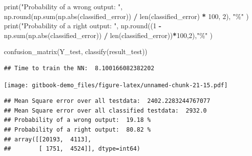 \documentclass[
]{book}
\newenvironment{Shaded}{\begin{snugshade}}{\end{snugshade}}
\newcommand{\BuiltInTok}[1]{#1}
\newcommand{\DecValTok}[1]{\textcolor[rgb]{0.00,0.00,0.81}{#1}}
\newcommand{\NormalTok}[1]{#1}
\newcommand{\OperatorTok}[1]{\textcolor[rgb]{0.81,0.36,0.00}{\textbf{#1}}}
\newcommand{\StringTok}[1]{\textcolor[rgb]{0.31,0.60,0.02}{#1}}
\begin{document}
\begin{Shaded}
\begin{Highlighting}[]
\BuiltInTok{print}\NormalTok{(}\StringTok{"Probability of a wrong output: "}\NormalTok{, np.}\BuiltInTok{round}\NormalTok{(np.}\BuiltInTok{sum}\NormalTok{(np.}\BuiltInTok{abs}\NormalTok{(classified\_error)) }\OperatorTok{/} \BuiltInTok{len}\NormalTok{(classified\_error) }\OperatorTok{*} \DecValTok{100}\NormalTok{, }\DecValTok{2}\NormalTok{), }\StringTok{"\%"}\NormalTok{ )}
\BuiltInTok{print}\NormalTok{(}\StringTok{"Probability of a right output: "}\NormalTok{, np.}\BuiltInTok{round}\NormalTok{((}\DecValTok{1} \OperatorTok{{-}}\NormalTok{ np.}\BuiltInTok{sum}\NormalTok{(np.}\BuiltInTok{abs}\NormalTok{(classified\_error)) }\OperatorTok{/} \BuiltInTok{len}\NormalTok{(classified\_error))}\OperatorTok{*}\DecValTok{100}\NormalTok{,}\DecValTok{2}\NormalTok{),}\StringTok{"\%"}\NormalTok{ )}


\NormalTok{confusion\_matrix(Y\_test, classify(result\_test))}
\end{Highlighting}
\end{Shaded}

\begin{verbatim}
## Time to train the NN:  8.100166082382202
\end{verbatim}

\texttt{[image: gitbook-demo\_files/figure-latex/unnamed-chunk-21-15.pdf]}

\begin{verbatim}
## Mean Square error over all testdata:  2402.2283244767077
## Mean Square error over all classified testdata:  2932.0
## Probability of a wrong output:  19.18 %
## Probability of a right output:  80.82 %
## array([[20193,  4113],
##        [ 1751,  4524]], dtype=int64)
\end{verbatim}
\end{document}
